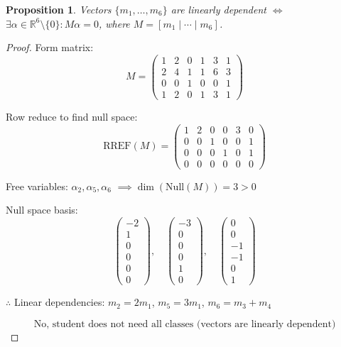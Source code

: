 \documentclass[12pt]{article}
\newtheorem{proposition}{Proposition}
\theoremstyle{definition}
\begin{document}
\begin{proposition}
Vectors $\{m_1, \ldots, m_6\}$ are linearly dependent $\iff$ $\exists \alpha \in \mathbb{R}^6 \setminus \{0\}: M\alpha = 0$, where $M = [m_1 \mid \cdots \mid m_6]$.
\end{proposition}

\begin{proof}
Form matrix:
\[
M = \begin{pmatrix}
1 & 2 & 0 & 1 & 3 & 1 \\
2 & 4 & 1 & 1 & 6 & 3 \\
0 & 0 & 1 & 0 & 0 & 1 \\
1 & 2 & 0 & 1 & 3 & 1
\end{pmatrix}
\]

Row reduce to find null space:
\[
\text{RREF}(M) = \begin{pmatrix}
1 & 2 & 0 & 0 & 3 & 0 \\
0 & 0 & 1 & 0 & 0 & 1 \\
0 & 0 & 0 & 1 & 0 & 1 \\
0 & 0 & 0 & 0 & 0 & 0
\end{pmatrix}
\]

Free variables: $\alpha_2, \alpha_5, \alpha_6$ $\implies \dim(\text{Null}(M)) = 3 > 0$

Null space basis:
\[
\begin{pmatrix} -2 \\ 1 \\ 0 \\ 0 \\ 0 \\ 0 \end{pmatrix}, \quad
\begin{pmatrix} -3 \\ 0 \\ 0 \\ 0 \\ 1 \\ 0 \end{pmatrix}, \quad
\begin{pmatrix} 0 \\ 0 \\ -1 \\ -1 \\ 0 \\ 1 \end{pmatrix}
\]

$\therefore$ Linear dependencies: $m_2 = 2m_1$, $m_5 = 3m_1$, $m_6 = m_3 + m_4$

\[
\boxed{\text{No, student does not need all classes (vectors are linearly dependent)}}
\]
\end{proof}
\end{document}
